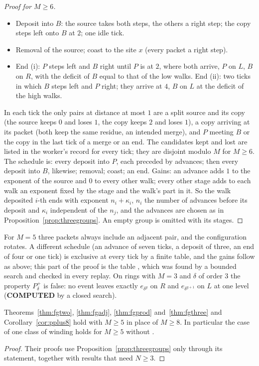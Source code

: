 \begin{proof}[Proof for $M\ge6$]
\begin{itemize}
\item Deposit into $B$: the source takes both steps, the others a right step; the copy steps left onto $B$ at $2$; one idle tick.
\item Removal of the source; coast to the site $x$ (every packet a right step).
\item End (i): $P$ steps left and $B$ right until $P$ is at $2$, where both arrive, $P$ on $L$, $B$ on $R$, with the deficit of $B$ equal to that of the low walks. End (ii): two ticks in which $B$ steps left and $P$ right; they arrive at $4$, $B$ on $L$ at the deficit of the high walks.
\end{itemize}
In each tick the only pairs at distance at most $1$ are a split source and its copy (the source keeps $0$ and loses $1$, the copy keeps $2$ and loses $1$), a copy arriving at its packet (both keep the same residue, an intended merge), and $P$ meeting $B$ or the copy in the last tick of a merge or an end. The candidates kept and lost are listed in the worker's record \cite{comptp} for every tick; they are disjoint modulo $M$ for $M\ge6$. The schedule is: every deposit into $P$, each preceded by advances; then every deposit into $B$, likewise; removal; coast; an end. Gains: an advance adds $1$ to the exponent of the source and $0$ to every other walk; every other stage adds to each walk an exponent fixed by the stage and the walk's part in it. So the walk deposited $i$-th ends with exponent $n_i+\kappa_i$, $n_i$ the number of advances before its deposit and $\kappa_i$ independent of the $n_j$, and the advances are chosen as in Proposition~\ref{prop:threegroups}. An empty group is omitted with its stages.
\end{proof}
For $M=5$ three packets always include an adjacent pair, and the configuration rotates. A different schedule (an advance of seven ticks, a deposit of three, an end of four or one tick) is exclusive at every tick by a finite table, and the gains follow as above; this part of the proof is the table \cite{comptp}, which was found by a bounded search and checked in every replay. On rings with $M=3$ and $\delta$ of order $3$ the property $P^{+}_\delta$ is false: no event leaves exactly $e_{\delta^{g}}$ on $R$ and $e_{\delta^{g+1}}$ on $L$ at one level (\textbf{COMPUTED} by a closed search).

\begin{corollary}\label{cor:five}
Theorems~\ref{thm:fgtwo}, \ref{thm:fgadj}, \ref{thm:fgprod} and~\ref{thm:fgthree} and Corollary~\ref{cor:pplus8} hold with $M\ge5$ in place of $M\ge8$. In particular the case of one class of winding holds for $M\ge5$ without \cite{dgone}.
\end{corollary}
\begin{proof}
Their proofs use Proposition~\ref{prop:threegroups} only through its statement, together with results that need $N\ge3$.
\end{proof}

